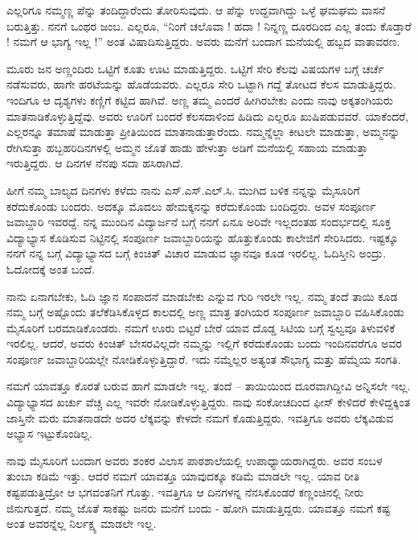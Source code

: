ಎಲ್ಲರಿಗೂ ನಮ್ಮಣ್ಣ ಪೆನ್ನು ತಂದಿದ್ದಾರೆಂದು ತೋರಿಸುವುದು. ಆ ಪೆನ್ನು ಉದ್ದವಾಗಿದ್ದು ಒಳ್ಳೆ ಘಮಘಮ ವಾಸನೆ ಬರುತ್ತಿತ್ತು.  ನನಗೆ ಒಂಥರ ಜಂಬ. ಎಲ್ಲರೂ, “ನಿಂಗೆ ಚಲೊವಾ ! ಹದಾ ! ನಿನ್ನಣ್ಣ ದೂರದಿಂದ ಎಲ್ಲ ತಂದು ಕೊಡ್ತಾರೆ ! ನಮಗೆ ಆ ಭಾಗ್ಯ ಇಲ್ಲ !” ಅಂತ ವಿಷಾದಿಸುತ್ತಿದ್ದರು.  ಅವರು ಮನೆಗೆ ಬಂದಾಗ  ಮನೆಯಲ್ಲಿ ಹಬ್ಬದ ವಾತಾವರಣ.  

ಮೂರು ಜನ ಅಣ್ಣಂದಿರು ಒಟ್ಟಿಗೆ ಕೂತು ಊಟ ಮಾಡುತ್ತಿದ್ದರು. ಒಟ್ಟಿಗೆ ಸೇರಿ ಕೆಲವು ವಿಷಯಗಳ ಬಗ್ಗೆ ಚರ್ಚೆ ನಡೆಸುವರು, ಹಾಗೇ ಹರಟೆಯನ್ನು ಹೊಡೆಯವರು.  ಎಲ್ಲರೂ ಸೇರಿ ಒಟ್ಟಾಗಿ ಗದ್ದೆ ತೋಟದ ಕೆಲಸ ಮಾಡುತ್ತಿದ್ದರು. ಇಂದಿಗೂ ಆ ದೃಶ್ಯಗಳು ಕಣ್ಣಿಗೆ ಕಟ್ಟಿದ ಹಾಗಿವೆ.  ಅಣ್ಣ ತಮ್ಮ ಎಂದರೆ ಹೀಗಿರಬೇಕು ಎಂದು ನಾವು ಅಕ್ಕತಂಗಿಯರು ಮಾತನಾಡಿಕೊಳ್ಳುತ್ತಿದ್ದೆವು. ಅವರು ಊರಿಗೆ ಬಂದರೆ ಕೆಲಸದಾಳಿಂದ ಹಿಡಿದು ಎಲ್ಲರೂ ಖುಷಿಪಡುವವರೆ. ಯಾಕೆಂದರೆ, ಎಲ್ಲರನ್ನೂ ತಮಾಷೆ ಮಾಡುತ್ತಾ ಪ್ರೀತಿಯಿಂದ ಮಾತನಾಡುತ್ತಾರೆಂದು.  ನಮ್ಮನ್ನೆಲ್ಲಾ ಕೀಟಲೇ ಮಾಡುತ್ತಾ, ಅಮ್ಮನನ್ನು ರೇಗಿಸುತ್ತಾ ಹಬ್ಬಹರಿದಿನಗಳಲ್ಲಿ ಅಮ್ಮನ ಜೊತೆ ಹಾಡು ಹೇಳುತ್ತಾ ಅಡಿಗೆ ಮನೆಯಲ್ಲಿ ಸಹಾಯ ಮಾಡುತ್ತಾ ಇರುತ್ತಿದ್ದರು.  ಆ ದಿನಗಳ ನೆನಪು ಸದಾ ಹಸಿರಾಗಿದೆ.

ಹೀಗೆ ನಮ್ಮ ಬಾಲ್ಯದ ದಿನಗಳು ಕಳೆದು ನಾನು ಎಸ್.ಎಸ್.ಎಲ್.ಸಿ. ಮುಗಿದ ಬಳಿಕ ನನ್ನನ್ನು ಮೈಸೂರಿಗೆ ಕರೆದುಕೊಂಡು ಬಂದರು. ಅದಕ್ಕೂ ಮೊದಲು ಹೇಮಕ್ಕನನ್ನು ಕರೆದುಕೊಂಡು ಬಂದಿದ್ದರು. ಅವಳ ಸಂಪೂರ್ಣ ಜವಾಬ್ದಾರಿ ಇವರದ್ದೆ.  ನನ್ನ ಮುಂದಿನ ವಿದ್ಯಾರ್ಜನೆ ಬಗ್ಗೆ ನನಗೆ ಏನೂ ಅರಿವೇ ಇಲ್ಲದಂತಹ ಸಂದರ್ಭದಲ್ಲಿ ಸೂಕ್ತ ವಿದ್ಯಾಭ್ಯಾಸ ಕೊಡಿಸುವ ನಿಟ್ಟಿನಲ್ಲಿ  ಸಂಪೂರ್ಣ  ಜವಾಬ್ದಾರಿಯನ್ನು ಹೊತ್ತುಕೊಂಡು ಕಾಲೇಜಿಗೆ ಸೇರಿಸಿದರು. ಇಷ್ಟಕ್ಕೂ ನನಗೆ ನನ್ನ ಬಗ್ಗೆ ವಿದ್ಯಾಭ್ಯಾಸದ ಬಗ್ಗೆ ಕಿಂಚಿತ್ ವಿಚಾರ ಮಾಡುವ ಜ್ಞಾನವೂ ಕೂಡ ಇರಲಿಲ್ಲ. ಓದಿಸ್ತೀನಿ ಅಂದ್ರು. ಓದೋದಕ್ಕೆ ಅಂತ ಬಂದೆ. 

ನಾನು ಏನಾಗಬೇಕು, ಓದಿ ಜ್ಞಾನ ಸಂಪಾದನೆ ಮಾಡಬೇಕು ಎನ್ನುವ ಗುರಿ ಇರಲೇ ಇಲ್ಲ. ನಮ್ಮ ತಂದೆ ತಾಯಿ ಕೂಡ ನಮ್ಮ ಬಗ್ಗೆ ಅಷ್ಟೊಂದು ತಲೆಕೆಡಿಸಿಕೊಳ್ಳದ ಕಾಲದಲ್ಲಿ ಅಣ್ಣ ಮಾತ್ರ ತಂಗಿಯರ ಸಂಪೂರ್ಣ ಜವಾಬ್ದಾರಿ ವಹಿಸಿಕೊಂಡು ಮೈಸೂರಿಗೆ ಬರಮಾಡಿಕೊಂಡರು.  ನಮಗೆ ಊರು ಬಿಟ್ಟರೆ ಬೇರೆ ಯಾವ ದೊಡ್ಡ ಸಿಟಿಯ ಬಗ್ಗೆ ಸ್ವಲ್ವವೂ ತಿಳುವಳಿಕೆ ಇರಲಿಲ್ಲ. ಆದರೆ, ಅವರು ಕಿಂಚಿತ್ ಬೇಸರವಿಲ್ಲದೇ ನಮ್ಮನ್ನು ಇಲ್ಲಿಗೆ ಕರೆದುಕೊಂಡು ಬಂದು ಇಂದಿನವರೆಗೂ ಅವರ ಸಂಪೂರ್ಣ ಜವಾಬ್ದಾರಿಯಲ್ಲೇ ನೋಡಿಕೊಳ್ಳುತ್ತಿದ್ದಾರೆ.  ಇದು ನಮ್ಮೆಲ್ಲರ ಅತ್ಯಂತ ಸೌಭಾಗ್ಯ ಮತ್ತು ಹೆಮ್ಮೆಯ ಸಂಗತಿ. 

ನಮಗೆ ಯಾವತ್ತೂ ಕೊರತೆ ಬರುವ ಹಾಗೆ ಮಾಡಲೇ ಇಲ್ಲ. ತಂದೆ – ತಾಯಿಯಿಂದ ದೂರವಾಗಿದ್ದೀವಿ ಅನ್ನಿಸಲೇ ಇಲ್ಲ. ವಿದ್ಯಾಭ್ಯಾಸದ ಖರ್ಚು ವೆಚ್ಚ ಎಲ್ಲ ಇವರೇ ನೋಡಿಕೊಳ್ಳುತ್ತಿದ್ದರು.  ನಾವು ಸಂಕೋಚದಿಂದ ಫೀಸ್ ಕೇಳಿದರೆ ಕೇಳಿದ್ದಕ್ಕಿಂತ ಜಾಸ್ತಿನೇ ಮರು ಮಾತನಾಡದೇ ಅದರ ಲೆಕ್ಕವನ್ನು ಕೇಳದೇ ನಮಗೆ ಕೊಡುತ್ತಿದ್ದರು.  ಇವತ್ತಿಗೂ ಅವರು ಲೆಕ್ಕವಿಡುವ ಅಭ್ಯಾಸ ಇಟ್ಟುಕೊಂಡಿಲ್ಲ.

ನಾವು ಮೈಸೂರಿಗೆ ಬಂದಾಗ ಅವರು ಶಂಕರ ವಿಲಾಸ  ಪಾಠಶಾಲೆಯಲ್ಲಿ ಉಪಾಧ್ಯಾಯರಾಗಿದ್ದರು.  ಅವರ ಸಂಬಳ ತುಂಬಾ ಕಡಿಮೆ ಇತ್ತು. ಆದರೆ ನಮಗೆ ಯಾವತ್ತೂ ಯಾವುದಕ್ಕೂ ಕಡಿಮೆ ಮಾಡಲೇ ಇಲ್ಲ.  ಯಾವ ರೀತಿ ಕಷ್ಟಪಡುತ್ತಿದ್ರೋ ಆ ಭಗವಂತನಿಗೆ ಗೊತ್ತು.  ಇವತ್ತಿಗೂ ಆ ದಿನಗಳನ್ನ ನೆನಸಿಕೊಂಡರೆ ಕಣ್ಣಂಚಿನಲ್ಲಿ ನೀರು ಜಿನುಗುತ್ತದೆ. ನಮ್ಮ ಜೊತೆ ಸಾಕಷ್ಟು ಜನರು ಮನೆಗೆ ಬಂದು - ಹೋಗಿ ಮಾಡುತ್ತಿದ್ದರು. ಯಾವತ್ತೂ ನಮಗೆ ಕಷ್ಟ ಅಂತ ಅವರನ್ನೆಲ್ಲ ನಿರ್ಲಕ್ಷ್ಯ ಮಾಡಲೇ ಇಲ್ಲ.

